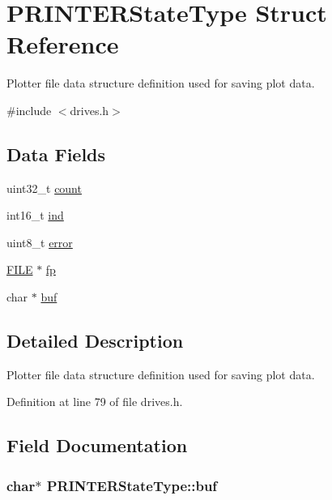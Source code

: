 \hypertarget{structPRINTERStateType}{}\section{P\+R\+I\+N\+T\+E\+R\+State\+Type Struct Reference}
\label{structPRINTERStateType}


Plotter file data structure definition used for saving plot data.  




{\ttfamily \#include $<$drives.\+h$>$}

\subsection*{Data Fields}
\begin{DoxyCompactItemize}
\item 
uint32\+\_\+t \hyperlink{structPRINTERStateType_ae115fc351910f3801e37b31f254fb8f4}{count}
\item 
int16\+\_\+t \hyperlink{structPRINTERStateType_a7d8873d0011f31d7dd00c2b7e0d362bd}{ind}
\item 
uint8\+\_\+t \hyperlink{structPRINTERStateType_a6e5b550f5396901febd5475445132dd0}{error}
\item 
\hyperlink{posix_8h_aed4dabeb9f7c518ded42f930a04abce8}{F\+I\+LE} $\ast$ \hyperlink{structPRINTERStateType_a791c78d68d169f9d2e60d34b890e520a}{fp}
\item 
char $\ast$ \hyperlink{structPRINTERStateType_aa48220761aa3c77c954a55f09388c615}{buf}
\end{DoxyCompactItemize}


\subsection{Detailed Description}
Plotter file data structure definition used for saving plot data. 

Definition at line 79 of file drives.\+h.



\subsection{Field Documentation}
\subsubsection[{\texorpdfstring{buf}{buf}}]{\setlength{\rightskip}{0pt plus 5cm}char$\ast$ P\+R\+I\+N\+T\+E\+R\+State\+Type\+::buf}\hypertarget{structPRINTERStateType_aa48220761aa3c77c954a55f09388c615}{}\label{structPRINTERStateType_aa48220761aa3c77c954a55f09388c615}


